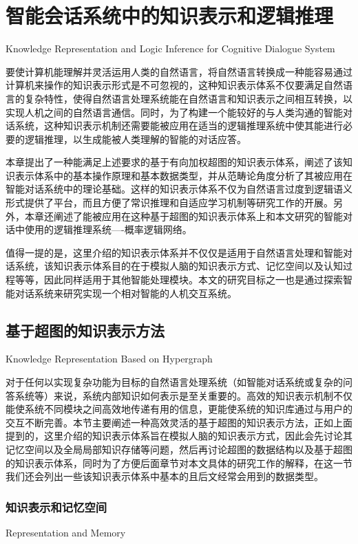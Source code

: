 \chapter{智能会话系统中的知识表示和逻辑推理}{Knowledge Representation and Logic Inference for Cognitive Dialogue System}
\label{chap:representation}


要使计算机能理解并灵活运用人类的自然语言，将自然语言转换成一种能容易通过计算机来操作的知识表示形式是不可忽视的，这种知识表示体系不仅要满足自然语言的复杂特性，使得自然语言处理系统能在自然语言和知识表示之间相互转换，以实现人机之间的自然语言通信。同时，为了构建一个能较好的与人类沟通的智能对话系统，这种知识表示机制还需要能被应用在适当的逻辑推理系统中使其能进行必要的逻辑推理，以生成能被人类理解的智能的对话应答。

本章提出了一种能满足上述要求的基于有向加权超图的知识表示体系，阐述了该知识表示体系中的基本操作原理和基本数据类型，并从范畴论角度分析了其被应用在智能对话系统中的理论基础。这样的知识表示体系不仅为自然语言过度到逻辑语义形式提供了平台，而且方便了常识推理和自适应学习机制等研究工作的开展。另外，本章还阐述了能被应用在这种基于超图的知识表示体系上和本文研究的智能对话中使用的逻辑推理系统----概率逻辑网络。

值得一提的是，这里介绍的知识表示体系并不仅仅是适用于自然语言处理和智能对话系统，该知识表示体系目的在于模拟人脑的知识表示方式、记忆空间以及认知过程等等，因此同样适用于其他智能处理模块。本文的研究目标之一也是通过探索智能对话系统来研究实现一个相对智能的人机交互系统。

\section{基于超图的知识表示方法}{Knowledge Representation Based on Hypergraph}

对于任何以实现复杂功能为目标的自然语言处理系统（如智能对话系统或复杂的问答系统等）来说，系统内部知识如何表示是至关重要的。高效的知识表示机制不仅能使系统不同模块之间高效地传递有用的信息，更能使系统的知识库通过与用户的交互不断完善。本节主要阐述一种高效灵活的基于超图的知识表示方法，正如上面提到的，这里介绍的知识表示体系旨在模拟人脑的知识表示方式，因此会先讨论其记忆空间以及全局局部知识存储等问题，然后再讨论超图的数据结构以及基于超图的知识表示体系，同时为了方便后面章节对本文具体的研究工作的解释，在这一节我们还会列出一些该知识表示体系中基本的且后文经常会用到的数据类型。

\subsection{知识表示和记忆空间}{Representation and Memory}

